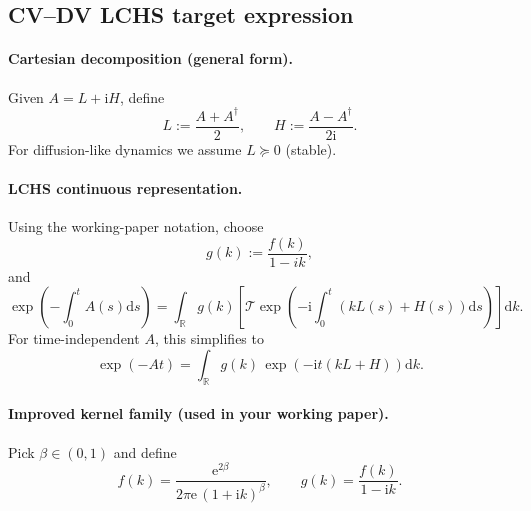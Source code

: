 \documentclass[11pt]{article}
\newcommand{\dd}{\mathrm{d}}
\newcommand{\ii}{\mathrm{i}}
\newcommand{\ee}{\mathrm{e}}
\newcommand{\RR}{\mathbb{R}}
\begin{document}
\subsection{CV--DV LCHS target expression}

\paragraph{Cartesian decomposition (general form).}
Given $A=L+\ii H$, define
\begin{equation}
L:=\frac{A+A^\dagger}{2},\qquad H:=\frac{A-A^\dagger}{2\ii}.
\end{equation}
For diffusion-like dynamics we assume $L\succeq 0$ (stable).

\paragraph{LCHS continuous representation.}
Using the working-paper notation, choose
\begin{equation}
g(k):=\frac{f(k)}{1-ik},
\end{equation}
and
\begin{equation}
\exp\!\left(-\int_0^t A(s)\dd s\right)
=\int_{\RR} g(k)\left[\mathcal{T}\exp\!\left(-\ii\int_0^t (kL(s)+H(s))\dd s\right)\right]\dd k.
\end{equation}
For time-independent $A$, this simplifies to
\begin{equation}
\exp(-At)=\int_{\RR} g(k)\,\exp\!\left(-\ii t(kL+H)\right)\dd k.
\end{equation}

\paragraph{Improved kernel family (used in your working paper).}
Pick $\beta\in(0,1)$ and define
\begin{equation}
f(k)=\frac{\ee^{2\beta}}{2\pi \ee\, (1+\ii k)^\beta},\qquad
g(k)=\frac{f(k)}{1-\ii k}.
\end{equation}
\end{document}
